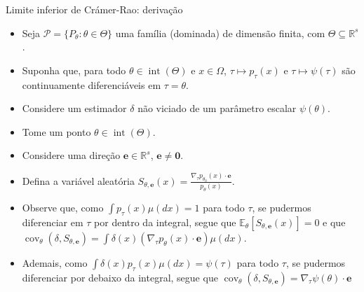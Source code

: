 \documentclass[11pt]{beamer}
\begin{document}
	\begin{frame}{Limite inferior de Crámer-Rao: derivação}
		\begin{itemize}
				\item Seja $\mathcal{P} = \{P_\theta : \theta  \in \Theta\}$ uma família (dominada) de dimensão finita, com $\Theta \subseteq \mathbb{R}^s$.
				\item Suponha que, para todo $\theta \in \operatorname{int}(\Theta)$ e $x \in \Omega$, $\tau \mapsto p_\tau(x)$ e $\tau \mapsto \psi(\tau)$ são continuamente diferenciáveis em $\tau = \theta$.
			\item Considere um estimador $\delta$ não viciado de um parâmetro escalar $\psi(\theta)$.
			\item Tome um ponto $\theta \in \operatorname{int}(\Theta)$.
			
			\item Considere uma direção $\boldsymbol{e} \in \mathbb{R}^s$, $\boldsymbol{e} \neq \boldsymbol{0}$.
			\item Defina a variável aleatória $S_{\theta,\boldsymbol{e}}(x) = \frac{\nabla_{\tau} p_{\theta_0}(x) \cdot \boldsymbol{e}}{p_{\theta}(x)}$.
				\item Observe que, como $\int p_{\tau}(x)\mu(dx)=1$ para todo $\tau$, se pudermos diferenciar em $\tau$ por dentro da integral, segue que $\mathbb{E}_{\theta}[S_{\theta,\boldsymbol{e}}(x)] = 0$ e que $\operatorname{cov}_{\theta}(\delta, S_{\theta,\boldsymbol{e}}) = \int\delta(x)  (\nabla_{\tau} p_{\theta}(x) \cdot \boldsymbol{e})  \mu(dx)$.
				\item Ademais, como $\int \delta(x) p_\tau(x) \mu(dx) =\psi(\tau) $ para todo $\tau$, se pudermos diferenciar por debaixo da integral, segue que $   \operatorname{cov}_{\theta}(\delta, S_{\theta,\boldsymbol{e}}) =\nabla_{\tau}\psi(\theta) \cdot \boldsymbol{e}$
			
		\end{itemize}

		
	
		
	\end{frame}
	
\end{document}
